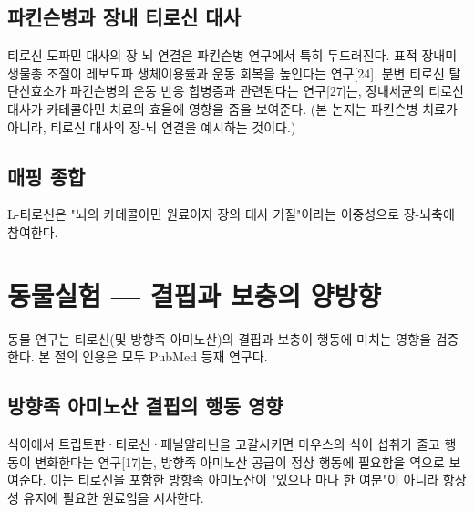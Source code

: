 \documentclass[11pt,oneside]{book}
\begin{document}
\subsection{파킨슨병과 장내 티로신 대사}
티로신-도파민 대사의 장-뇌 연결은 파킨슨병 연구에서 특히 두드러진다. 표적 장내미생물총 조절이 레보도파 생체이용률과 운동 회복을 높인다는 연구[24], 분변 티로신 탈탄산효소가 파킨슨병의 운동 반응 합병증과 관련된다는 연구[27]는, 장내세균의 티로신 대사가 카테콜아민 치료의 효율에 영향을 줌을 보여준다. (본 논지는 파킨슨병 치료가 아니라, 티로신 대사의 장-뇌 연결을 예시하는 것이다.)

\subsection{매핑 종합}
\vspace{2pt}\vspace{3pt}

L-티로신은 "뇌의 카테콜아민 원료이자 장의 대사 기질"이라는 이중성으로 장-뇌축에 참여한다.

\section{동물실험 — 결핍과 보충의 양방향}
동물 연구는 티로신(및 방향족 아미노산)의 결핍과 보충이 행동에 미치는 영향을 검증한다. 본 절의 인용은 모두 PubMed 등재 연구다.

\subsection{방향족 아미노산 결핍의 행동 영향}
식이에서 트립토판·티로신·페닐알라닌을 고갈시키면 마우스의 식이 섭취가 줄고 행동이 변화한다는 연구[17]는, 방향족 아미노산 공급이 정상 행동에 필요함을 역으로 보여준다. 이는 티로신을 포함한 방향족 아미노산이 "있으나 마나 한 여분"이 아니라 항상성 유지에 필요한 원료임을 시사한다.
\end{document}
